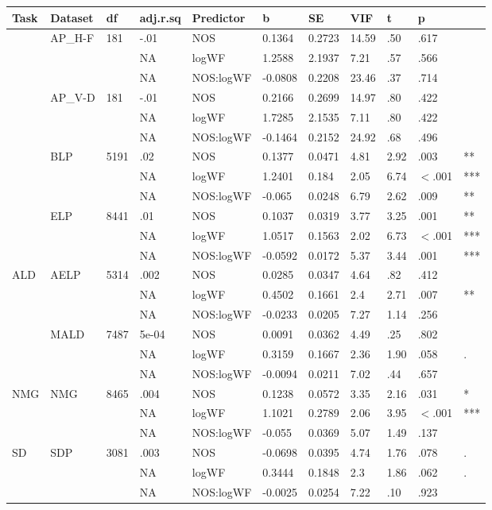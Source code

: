\begin{table}[ht]
\centering
\begingroup\normalsize
\begin{tabular}{lllllllllll}
  \hline
Task & Dataset & df & adj.r.sq & Predictor & b & SE & VIF & t & p &  \\ 
  \hline
 & AP\_H-F & 181 & -.01 & NOS & 0.1364 & 0.2723 & 14.59 & .50 & .617 &   \\ 
   &  &  & NA & logWF & 1.2588 & 2.1937 & 7.21 & .57 & .566 &   \\ 
   &  &  & NA & NOS:logWF & -0.0808 & 0.2208 & 23.46 & .37 & .714 &   \\ 
   & AP\_V-D & 181 & -.01 & NOS & 0.2166 & 0.2699 & 14.97 & .80 & .422 &   \\ 
   &  &  & NA & logWF & 1.7285 & 2.1535 & 7.11 & .80 & .422 &   \\ 
   &  &  & NA & NOS:logWF & -0.1464 & 0.2152 & 24.92 & .68 & .496 &   \\ 
   & BLP & 5191 & .02 & NOS & 0.1377 & 0.0471 & 4.81 & 2.92 & .003 & ** \\ 
   &  &  & NA & logWF & 1.2401 & 0.184 & 2.05 & 6.74 & $<$.001 & *** \\ 
   &  &  & NA & NOS:logWF & -0.065 & 0.0248 & 6.79 & 2.62 & .009 & ** \\ 
   & ELP & 8441 & .01 & NOS & 0.1037 & 0.0319 & 3.77 & 3.25 & .001 & ** \\ 
   &  &  & NA & logWF & 1.0517 & 0.1563 & 2.02 & 6.73 & $<$.001 & *** \\ 
   &  &  & NA & NOS:logWF & -0.0592 & 0.0172 & 5.37 & 3.44 & .001 & *** \\ 
  ALD & AELP & 5314 & .002 & NOS & 0.0285 & 0.0347 & 4.64 & .82 & .412 &   \\ 
   &  &  & NA & logWF & 0.4502 & 0.1661 & 2.4 & 2.71 & .007 & ** \\ 
   &  &  & NA & NOS:logWF & -0.0233 & 0.0205 & 7.27 & 1.14 & .256 &   \\ 
   & MALD & 7487 & 5e-04 & NOS & 0.0091 & 0.0362 & 4.49 & .25 & .802 &   \\ 
   &  &  & NA & logWF & 0.3159 & 0.1667 & 2.36 & 1.90 & .058 & . \\ 
   &  &  & NA & NOS:logWF & -0.0094 & 0.0211 & 7.02 & .44 & .657 &   \\ 
  NMG & NMG & 8465 & .004 & NOS & 0.1238 & 0.0572 & 3.35 & 2.16 & .031 & * \\ 
   &  &  & NA & logWF & 1.1021 & 0.2789 & 2.06 & 3.95 & $<$.001 & *** \\ 
   &  &  & NA & NOS:logWF & -0.055 & 0.0369 & 5.07 & 1.49 & .137 &   \\ 
  SD & SDP & 3081 & .003 & NOS & -0.0698 & 0.0395 & 4.74 & 1.76 & .078 & . \\ 
   &  &  & NA & logWF & 0.3444 & 0.1848 & 2.3 & 1.86 & .062 & . \\ 
   &  &  & NA & NOS:logWF & -0.0025 & 0.0254 & 7.22 & .10 & .923 &   \\ 
   \hline
\end{tabular}
\endgroup
\end{table}
